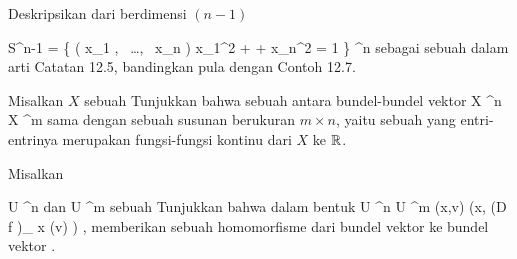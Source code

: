 {}
{

Deskripsikan
dari
berdimensi $(n-1 )$

\mavergleichskettedisp
{\vergleichskette
{ S^{n-1}
}
{ =} { \left\{  \left(  x_1   , \,   \ldots  , \,   x_n          \right)   \mid   x_1^2 + \cdots + x_n^2 = 1         \right\}
}
{ \subset} { \R^n
}
{ } {
}
{ } {
}
}
{}{}{}
sebagai sebuah
dalam arti
Catatan 12.5,
bandingkan pula dengan
Contoh 12.7.

}
{} {}

{}
{

Misalkan $X$ sebuah
Tunjukkan bahwa sebuah
antara bundel-bundel vektor
 {} {}
\maabbdisp {\varphi} {X \times \R^n } { X \times \R^m
} {}
sama dengan sebuah susunan berukuran
$m \times n$, yaitu sebuah
yang entri-entrinya merupakan fungsi-fungsi kontinu dari $X$ ke ${\mathbb R}$.

}
{} {}

{}
{

Misalkan

\mavergleichskette
{\vergleichskette
{U
}
{ \subseteq }{ \R^n
}
{  }{
}
{    }{
}
{   }{
}
}
{}{}{}
dan
 { U } { \R^m
} {}
sebuah
Tunjukkan bahwa
dalam bentuk
\maabbeledisp {} { U \times \R^n } { U \times \R^m
} { (x,v)} { (x, \left(D f \right)_{ x} (v) )
} {,}
memberikan sebuah homomorfisme dari bundel vektor
 ke bundel vektor
.

}
{} {}

